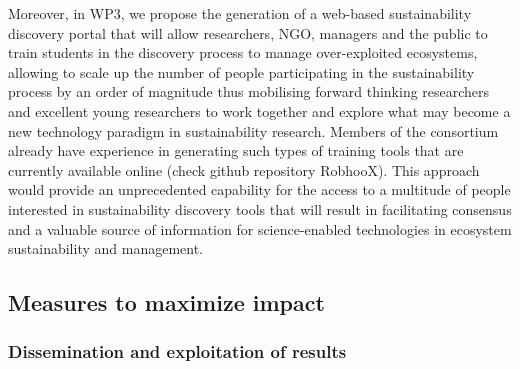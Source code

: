 \documentclass[11pt, a4paper]{article} %
\begin{document}
\begin{itemize}
  Moreover, in WP3, we propose the generation of a web-based
  sustainability discovery portal that will allow researchers, NGO,
  managers and the public to train students in the discovery process
  to manage over-exploited ecosystems, allowing to scale up the number
  of people participating in the sustainability process by an order of
  magnitude thus mobilising forward thinking researchers and excellent
  young researchers to work together and explore what may become a new
  technology paradigm in sustainability research. Members of the
  consortium already have experience in generating such types of
  training tools that are currently available online (check github
  repository RobhooX). This approach would provide an unprecedented
  capability for the access to a multitude of people interested in
  sustainability discovery tools that will result in facilitating
  consensus and a valuable source of information for science-enabled
  technologies in ecosystem sustainability and management.
\end{itemize}
 
  
\subsection{Measures to maximize impact} 
\label{sec:maximize-impact}

\subsubsection{Dissemination and exploitation of results}
\end{document}
